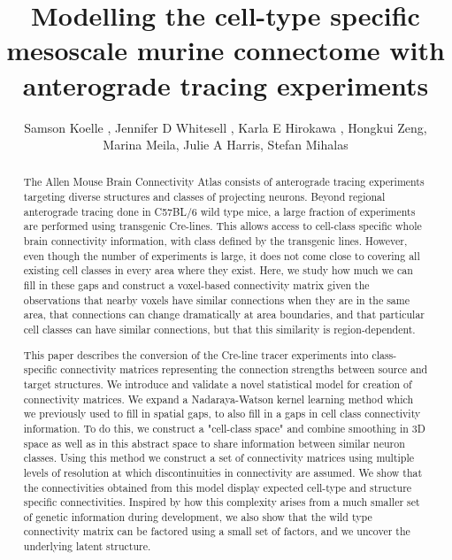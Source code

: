\documentclass[NETN,manuscript]{stjour-new}
\begin{document}
\title{Modelling the cell-type specific mesoscale murine connectome with anterograde tracing experiments}

\author[Koelle et al]%
{Samson Koelle , Jennifer D Whitesell , Karla E Hirokawa ,  Hongkui Zeng, Marina Meila, Julie A Harris, Stefan Mihalas}





\begin{abstract}
The Allen Mouse Brain Connectivity Atlas consists of anterograde tracing experiments targeting diverse structures and classes of projecting neurons.
Beyond regional anterograde tracing done in C57BL/6 wild type mice, a large fraction of experiments are performed using transgenic Cre-lines.
This allows access to cell-class specific whole brain connectivity information, with class defined by the transgenic lines.
However, even though the number of experiments is large, it does not come close to covering all existing cell classes in every area where they exist.
Here, we study how much we can fill in these gaps and construct a voxel-based connectivity matrix given the observations that nearby voxels have similar connections when they are in the same area, that connections can change dramatically at area boundaries, and that particular cell classes can have similar connections, but that this similarity is region-dependent.  

This paper describes the conversion of the Cre-line tracer experiments into class-specific connectivity matrices representing the connection strengths between source and target structures. We introduce and validate a novel statistical model for creation of connectivity matrices. We expand a Nadaraya-Watson kernel learning method which we previously used to fill in spatial gaps, to also fill in a gaps in cell class connectivity information. To do this, we construct a "cell-class space" and combine smoothing in 3D space as well as in this abstract space to share information between similar neuron classes.
Using this method we construct a set of connectivity matrices using multiple levels of resolution at which discontinuities in connectivity are assumed. We show that the connectivities obtained from this model display expected cell-type and structure specific connectivities. 
Inspired by how this complexity arises from a much smaller set of genetic information during development, we also show that the wild type connectivity matrix can be factored using a small set of factors, and we uncover the underlying latent structure.

\end{abstract}
\end{document}
